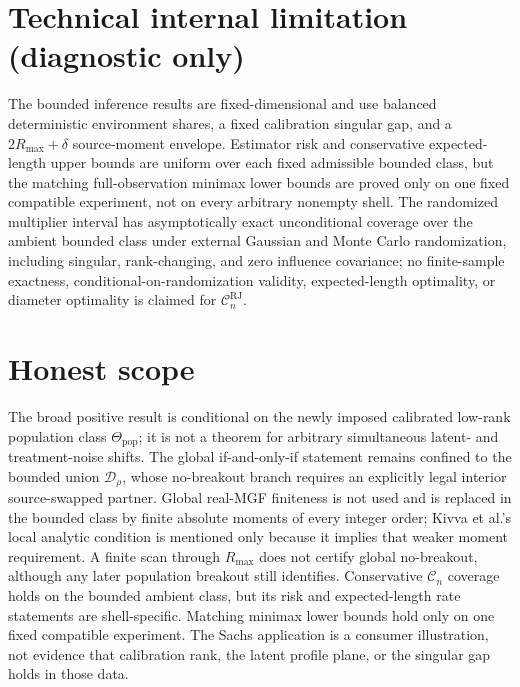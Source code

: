 \documentclass{article}
\begin{document}
\section*{Technical internal limitation (diagnostic only)}

The bounded inference results are fixed-dimensional and use balanced deterministic environment shares, a fixed calibration singular gap, and a \(2R_{\max}+\delta\) source-moment envelope.  Estimator risk and conservative expected-length upper bounds are uniform over each fixed admissible bounded class, but the matching full-observation minimax lower bounds are proved only on one fixed compatible experiment, not on every arbitrary nonempty shell.  The randomized multiplier interval has asymptotically exact unconditional coverage over the ambient bounded class under external Gaussian and Monte Carlo randomization, including singular, rank-changing, and zero influence covariance; no finite-sample exactness, conditional-on-randomization validity, expected-length optimality, or diameter optimality is claimed for \(\mathcal C_n^{\mathrm{RJ}}\).

\section{Honest scope}

The broad positive result is conditional on the newly imposed calibrated low-rank population class \(\Theta_{\mathrm{pop}}\); it is not a theorem for arbitrary simultaneous latent- and treatment-noise shifts.  The global if-and-only-if statement remains confined to the bounded union \(\mathcal D_\rho\), whose no-breakout branch requires an explicitly legal interior source-swapped partner.  Global real-MGF finiteness is not used and is replaced in the bounded class by finite absolute moments of every integer order; Kivva et al.'s local analytic condition is mentioned only because it implies that weaker moment requirement.  A finite scan through \(R_{\max}\) does not certify global no-breakout, although any later population breakout still identifies.  Conservative \(\mathcal C_n\) coverage holds on the bounded ambient class, but its risk and expected-length rate statements are shell-specific.  Matching minimax lower bounds hold only on one fixed compatible experiment.  The Sachs application is a consumer illustration, not evidence that calibration rank, the latent profile plane, or the singular gap holds in those data.
\end{document}
